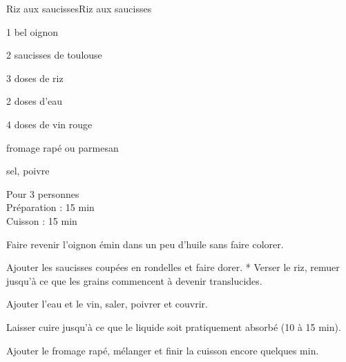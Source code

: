 \begin{recette}{Riz aux saucisses}{Riz aux saucisses}

\begin{ingredients}
1 bel oignon\par
2 saucisses de toulouse\par
3 doses de riz\par
2 doses d'eau\par
4 doses de vin rouge\par
fromage rapé ou parmesan\par
sel, poivre\par
\end{ingredients}

\begin{infos}
Pour 3 personnes\\
Préparation : 15 min\\
Cuisson : 15 min\\
\end{infos}

\begin{etapes}
\item Faire revenir l'oignon émin dans un peu d'huile sans faire colorer.
\item Ajouter les saucisses coupées en rondelles et faire dorer. * Verser le riz, remuer jusqu'à ce que les grains commencent à devenir translucides.
\item Ajouter l'eau et le vin, saler, poivrer et couvrir.
\item Laisser cuire jusqu'à ce que le liquide soit pratiquement absorbé (10 à 15 min).
\item Ajouter le fromage rapé, mélanger et finir la cuisson encore quelques min.
\end{etapes}

\end{recette}